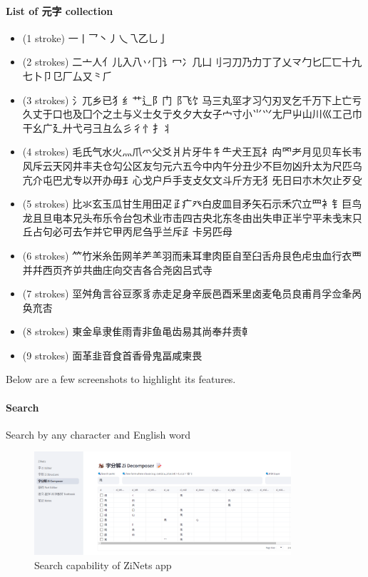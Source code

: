 \documentclass[
  11pt,
  letterpaper,
]{article}
\providecommand{\tightlist}{%
  \setlength{\itemsep}{0pt}\setlength{\parskip}{0pt}}
\begin{document}
\paragraph{List of 元字 collection}\label{list-of-ux5143ux5b57}

\begin{itemize}
\tightlist
\item
  (1 stroke) 一丨乛丶丿乀乁乙乚亅
\item
  (2 strokes)
  二亠人亻儿入八丷冂讠冖冫几凵刂刁刀乃力丁了乂龴勹匕匚匸十九七卜卩㔾厂厶又⺀⺁
\item
  (3 strokes)
  氵兀乡已犭纟艹辶阝门⻏飞饣马三丸坙才习勺刃叉乞千万下上亡亏久丈于口也及囗个之土与义士夂亍夊夕大女子宀寸小⺌⺍尢尸屮山川巛工己巾干幺广廴廾弋弓彐彑么彡彳忄扌丬
\item
  (4 strokes)
  毛氏气水火灬爪爫父爻爿片牙牛牜⺧犬王瓦礻禸罓耂月见贝车长韦风斥云天冈井丰夫仓勾公区友匀元六五今中内午分丑少不巨勿凶升太为尺匹乌亢介屯巴尤专以开办毋⺩心戈户戶手支攴攵文斗斤方无犭旡日曰朩木欠止歹殳
\item
  (5 strokes)
  比氺玄玉瓜甘生用田疋𤴔疒癶白皮皿目矛矢石示禾穴立罒衤钅巨鸟龙且旦电本兄头布乐令台包术业市击四古央北东冬由出失申正半宁平未戋末只丘占句必可去乍并它甲丙尼刍乎兰斥⺪卡另匹母
\item
  (6 strokes)
  ⺮竹米糸缶网羊⺶⺷羽而耒耳聿肉臣自至臼舌舟艮色虍虫血行衣覀并幷西页齐屰共曲庄向交吉各合尧囟吕式寺
\item
  (7 strokes)
  坙舛角言谷豆豕豸赤走足身辛辰邑酉釆里卤麦龟员良甫肙孚佥夆呙奂㐬㕻
\item
  (8 strokes) 東金阜隶隹雨青非鱼黾齿易其尚奉幷责龺
\item
  (9 strokes) 面革韭音食首香骨鬼畐咸柬畏
\end{itemize}


Below are a few screenshots to highlight its features.

\paragraph{Search}\label{search}

Search by any character and English word

\begin{figure}
\centering
\includegraphics[width=0.85\textwidth]{./images/app_discover-zi-by-part.png}
\caption{Search capability of ZiNets app}
\end{figure}
\end{document}
